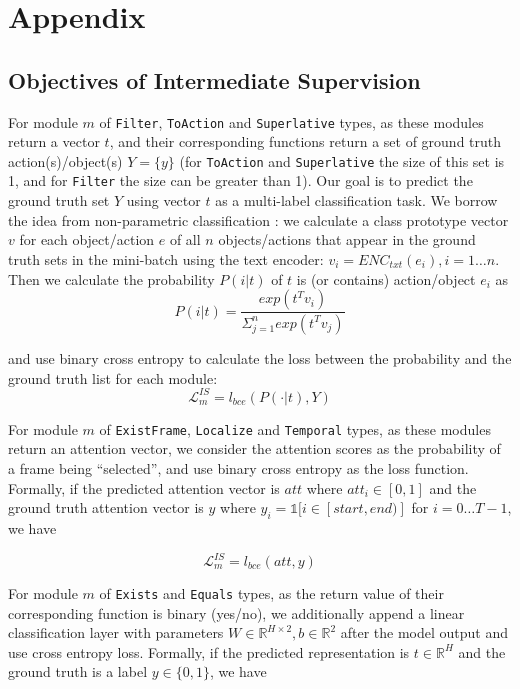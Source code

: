 \documentclass[letterpaper]{article} %
\begin{document}
\section{Appendix}

\subsection{Objectives of Intermediate Supervision}
For module $m$ of \texttt{Filter}, \texttt{ToAction} and \texttt{Superlative} types, as these modules return a vector $t$, and their corresponding functions return a set of ground truth action(s)/object(s) $Y=\{y\}$ (for \texttt{ToAction} and \texttt{Superlative} the size of this set is 1, and for \texttt{Filter} the size can be greater than 1). Our goal is to predict the ground truth set $Y$ using vector $t$ as a multi-label classification task. We borrow the idea from non-parametric classification \cite{Wu2018UnsupervisedFL}: we calculate a class prototype vector $v$ for each object/action $e$ of all $n$ objects/actions that appear in the ground truth sets in the mini-batch using the text encoder: $v_i={ENC}_{txt}(e_i), i=1 \dots n$. Then we calculate the probability $P(i|t)$ of $t$ is (or contains) action/object $e_i$ as
\begin{equation}
P(i|t)=\frac{exp(t^Tv_i)}{\Sigma_{j=1}^nexp(t^Tv_j)}
\end{equation}

and use binary cross entropy to calculate the loss between the probability and the ground truth list for each module:
\begin{equation}
\mathcal{L}^{IS}_m = l_{bce}(P(\cdot|t),Y)
\end{equation}

For module $m$ of \texttt{ExistFrame}, \texttt{Localize} and \texttt{Temporal} types, as these modules return an attention vector, we consider the attention scores as the probability of a frame being ``selected'', and use binary cross entropy as the loss function. Formally, if the predicted attention vector is $att$ where $att_i \in [0,1]$ and the ground truth attention vector is $y$ where $y_i = \mathds{1}[ i \in [start, end) ]$ for $i = 0 \dots T-1$, we have

\begin{equation}
\mathcal{L}^{IS}_m = l_{bce}(att, y)
\end{equation}

For module $m$ of \texttt{Exists} and \texttt{Equals} types, as the return value of their corresponding function is binary  (yes/no), we additionally append a linear classification layer with parameters $W \in \mathbb{R}^{H \times 2}, b \in \mathbb{R}^2$ after the model output and use cross entropy loss. Formally, if the predicted representation is $t \in \mathbb{R}^H$ and the ground truth is a label $y \in \{0, 1\}$, we have
\end{document}
